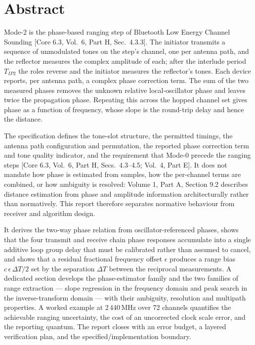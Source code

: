 \documentclass[11pt,a4paper]{article}
\newcommand{\Tipp}{T_{IP2}}
\newcommand{\core}[1]{\textcolor{rulegrey}{\small[Core 6.3, #1]}}
\begin{document}
\newpage
{}

\section*{Abstract}

Mode-2 is the phase-based ranging step of Bluetooth Low Energy Channel Sounding
\core{Vol.\ 6, Part H, Sec.\ 4.3.3}. The initiator transmits a sequence of unmodulated tones on the
step's channel, one per antenna path, and the reflector measures the complex amplitude of each; after
the interlude period $\Tipp$ the roles reverse and the initiator measures the reflector's tones. Each
device reports, per antenna path, a complex phase correction term. The sum of the two measured phases
removes the unknown relative local-oscillator phase and leaves twice the propagation phase. Repeating
this across the hopped channel set gives phase as a function of frequency, whose slope is the
round-trip delay and hence the distance.

The specification defines the tone-slot structure, the permitted timings, the antenna path
configuration and permutation, the reported phase correction term and tone quality indicator, and the
requirement that Mode-0 precede the ranging steps \core{Vol.\ 6, Part H, Secs.\ 4.3--4.5; Vol.\ 4,
Part E}. It does not mandate how phase is estimated from samples, how the per-channel terms are
combined, or how ambiguity is resolved: Volume 1, Part A, Section 9.2 describes distance estimation
from phase and amplitude information architecturally rather than normatively. This report therefore
separates normative behaviour from receiver and algorithm design.

It derives the two-way phase relation from oscillator-referenced phases, shows that the four
transmit and receive chain phase responses accumulate into a single additive loop group delay that
must be calibrated rather than assumed to cancel, and shows that a residual fractional frequency
offset $\epsilon$ produces a range bias $c\,\epsilon\,\Delta T/2$ set by the separation $\Delta T$
between the reciprocal measurements. A dedicated section develops the phase-estimator family and the
two families of range extraction --- slope regression in the frequency domain and peak search in the
inverse-transform domain --- with their ambiguity, resolution and multipath properties. A worked
example at 2\,440\,MHz over 72 channels quantifies the achievable ranging uncertainty, the cost of an
uncorrected clock scale error, and the reporting quantum. The report closes with an error budget, a
layered verification plan, and the specified/implementation boundary.
\end{document}
